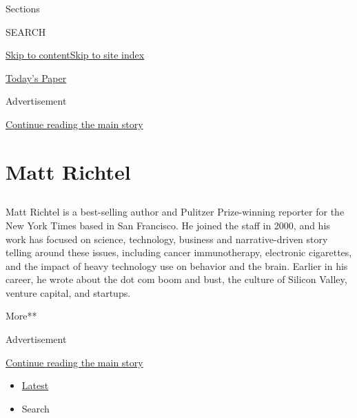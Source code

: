 Sections

SEARCH

\protect\hyperlink{site-content}{Skip to
content}\protect\hyperlink{site-index}{Skip to site index}

\href{https://myaccount.nytimes3xbfgragh.onion/auth/login?response_type=cookie\&client_id=vi}{}

\href{https://www.nytimes3xbfgragh.onion/section/todayspaper}{Today's
Paper}

Advertisement

\protect\hyperlink{after-top}{Continue reading the main story}

\hypertarget{matt-richtel}{%
\section{Matt Richtel}\label{matt-richtel}}

\subsection{}

Matt Richtel is a best-selling author and Pulitzer Prize-winning
reporter for the New York Times based in San Francisco. He joined the
staff in 2000, and his work has focused on science, technology, business
and narrative-driven story telling around these issues, including cancer
immunotherapy, electronic cigarettes, and the impact of heavy technology
use on behavior and the brain. Earlier in his career, he wrote about the
dot com boom and bust, the culture of Silicon Valley, venture capital,
and startups.

More**

Advertisement

\protect\hyperlink{after-mid1}{Continue reading the main story}

\begin{itemize}
\tightlist
\item
  \protect\hyperlink{stream-panel}{Latest}
\item
  Search
\end{itemize}

